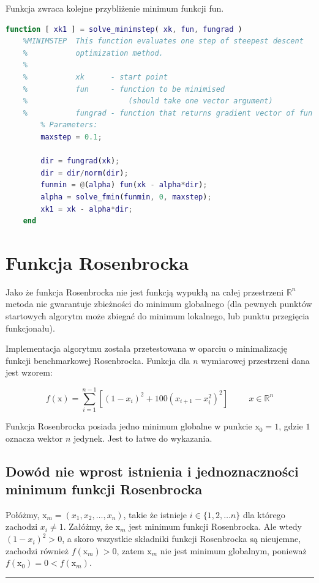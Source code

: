 \documentclass[12pt]{article}
\begin{document}
Funkcja zwraca kolejne przybliżenie minimum funkcji fun.

\begin{lstlisting}[language=MATLAB, style=mystyle]
    function [ xk1 ] = solve_minimstep( xk, fun, fungrad )
    %MINIMSTEP  This function evaluates one step of steepest descent
    %           optimization method.
    %
    %           xk      - start point
    %           fun     - function to be minimised
    %                       (should take one vector argument)
    %           fungrad - function that returns gradient vector of fun
        % Parameters:
        maxstep = 0.1;
    
        dir = fungrad(xk);
        dir = dir/norm(dir);
        funmin = @(alpha) fun(xk - alpha*dir);
        alpha = solve_fmin(funmin, 0, maxstep);
        xk1 = xk - alpha*dir;
    end
\end{lstlisting}

\newpage

\section*{Funkcja Rosenbrocka}

Jako że funkcja Rosenbrocka nie jest funkcją wypukłą na całej przestrzeni
$\mathbb{R}^{n}$ metoda nie gwarantuje zbieżności do minimum globalnego (dla
pewnych punktów startowych algorytm może zbiegać do minimum lokalnego, lub
punktu przegięcia funkcjonału).

Implementacja algorytmu została przetestowana w oparciu o minimalizację funkcji
benchmarkowej Rosenbrocka. Funkcja dla $n$ wymiarowej przestrzeni dana jest
wzorem:

\begin{equation}
    f(\mathrm{x}) = \sum^{n-1}_{i=1} \left[(1-x_i)^2 + 100(x_{i+1} -
    x_i^2)^2\right] \hspace{1cm} x \in \mathbb{R}^n
\end{equation}

Funkcja Rosenbrocka posiada jedno minimum globalne w punkcie
$\mathrm{x}_0 = \textrm{1}$, gdzie $1$ oznacza wektor $n$ jedynek. Jest to
łatwe do wykazania.

\subsection*{Dowód nie wprost istnienia i jednoznaczności minimum funkcji
Rosenbrocka}

Połóżmy, $\mathrm{x}_m = (x_1, x_2, \ldots, x_n)$, takie że istnieje $i \in
\{1,2,\ldots n\}$ dla którego zachodzi $x_i \neq 1$. Załóżmy, że $\mathrm{x}_m$
jest minimum funkcji Rosenbrocka. Ale wtedy $(1-x_i)^2 > 0$, a skoro wszystkie
składniki funkcji Rosenbrocka są nieujemne, zachodzi również $f(\mathrm{x}_m) >
0$, zatem $\mathrm{x}_m$ nie jest minimum globalnym, ponieważ $f(\mathrm{x}_0)
= 0 < f(\mathrm{x}_m)$.\\ \rule{1ex}{1ex}
\end{document}
